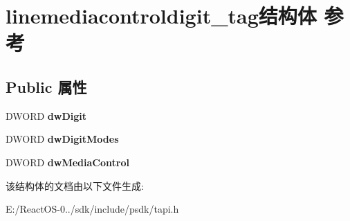 \hypertarget{structlinemediacontroldigit__tag}{}\section{linemediacontroldigit\+\_\+tag结构体 参考}
\label{structlinemediacontroldigit__tag}
\subsection*{Public 属性}
\begin{DoxyCompactItemize}
\item 
\mbox{\label{structlinemediacontroldigit__tag_a20e5e16c827c8409cf816dc49a3888f0}} 
D\+W\+O\+RD {\bfseries dw\+Digit}
\item 
\mbox{\label{structlinemediacontroldigit__tag_aca7cef0643085454a12094d6a0f0906b}} 
D\+W\+O\+RD {\bfseries dw\+Digit\+Modes}
\item 
\mbox{\label{structlinemediacontroldigit__tag_a0463e88305fcfe17540d789430e5ce32}} 
D\+W\+O\+RD {\bfseries dw\+Media\+Control}
\end{DoxyCompactItemize}


该结构体的文档由以下文件生成\+:\begin{DoxyCompactItemize}
\item 
E\+:/\+React\+O\+S-\/0../sdk/include/psdk/tapi.\+h\end{DoxyCompactItemize}
